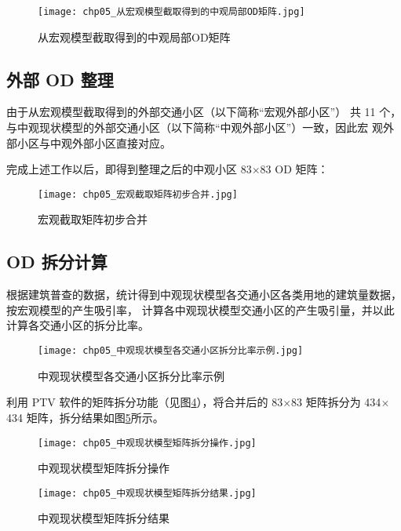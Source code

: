 \begin{figure}[!ht]
  \centering
  \texttt{[image: chp05\_从宏观模型截取得到的中观局部OD矩阵.jpg]}
  \caption{从宏观模型截取得到的中观局部OD矩阵\label{fig:chp05_从宏观模型截取得到的中观局部OD矩阵} }
\end{figure}

\subsection{外部 OD 整理}
由于从宏观模型截取得到的外部交通小区（以下简称“宏观外部小区”） 共 11
个， 与中观现状模型的外部交通小区（以下简称“中观外部小区”）一致，因此宏
观外部小区与中观外部小区直接对应。

完成上述工作以后，即得到整理之后的中观小区 83$\times$83 OD 矩阵：

\begin{figure}[!ht]
  \centering
  \texttt{[image: chp05\_宏观截取矩阵初步合并.jpg]}
  \caption{宏观截取矩阵初步合并\label{fig:chp05_宏观截取矩阵初步合并} }
\end{figure}

\subsection{OD 拆分计算}
根据建筑普查的数据，统计得到中观现状模型各交通小区各类用地的建筑量数据，按宏观模型的产生吸引率，
计算各中观现状模型交通小区的产生吸引量，并以此计算各交通小区的拆分比率。

\begin{figure}[!ht]
  \centering
  \texttt{[image: chp05\_中观现状模型各交通小区拆分比率示例.jpg]}
  \caption{中观现状模型各交通小区拆分比率示例\label{fig:chp05_中观现状模型各交通小区拆分比率示例} }
\end{figure}

利用 PTV 软件的矩阵拆分功能（见图\ref{fig:chp05_中观现状模型矩阵拆分操作}），将合并后的 83$\times$83 矩阵拆分为 434$\times$434 矩阵，拆分结果如图\ref{fig:chp05_中观现状模型矩阵拆分结果}所示。

\begin{figure}[!ht]
  \centering
  \texttt{[image: chp05\_中观现状模型矩阵拆分操作.jpg]}
  \caption{中观现状模型矩阵拆分操作\label{fig:chp05_中观现状模型矩阵拆分操作} }
\end{figure}

\begin{figure}[!ht]
  \centering
  \texttt{[image: chp05\_中观现状模型矩阵拆分结果.jpg]}
  \caption{中观现状模型矩阵拆分结果\label{fig:chp05_中观现状模型矩阵拆分结果} }
\end{figure}

